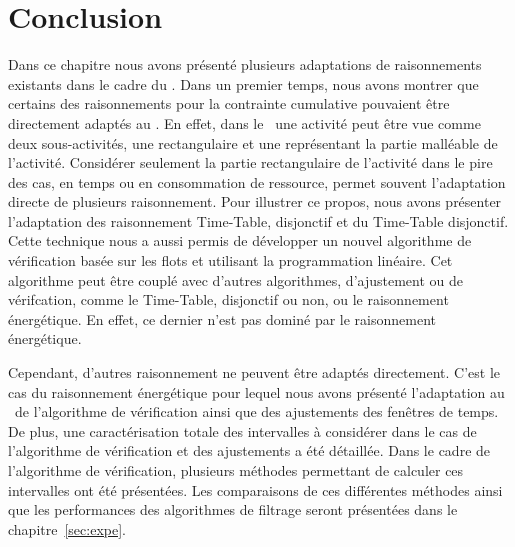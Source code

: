 \section*{Conclusion}

Dans ce chapitre nous avons présenté plusieurs adaptations de
raisonnements existants dans le cadre du \CECSP. Dans un premier
temps, nous avons montrer que certains des raisonnements pour la
contrainte cumulative pouvaient être directement adaptés au \CECSP. En
effet, dans le \CECSP~une activité peut être vue comme deux
sous-activités, une rectangulaire et une représentant la partie
malléable de l'activité. Considérer seulement la partie rectangulaire
de l'activité dans le pire des cas, en temps ou en consommation de
ressource, permet souvent l'adaptation directe de plusieurs
raisonnement. Pour illustrer ce propos, nous avons présenter
l'adaptation des raisonnement Time-Table, disjonctif et du Time-Table
disjonctif. Cette technique nous a aussi permis de développer un
nouvel algorithme de vérification basée sur les flots et utilisant la
programmation linéaire. Cet algorithme peut être couplé avec d'autres
algorithmes, d'ajustement ou de vérifcation, comme le Time-Table,
disjonctif ou non, ou le raisonnement énergétique. En effet, ce
dernier n'est pas dominé par le raisonnement énergétique.

Cependant, d'autres raisonnement ne peuvent être adaptés
directement. C'est le cas du raisonnement énergétique pour lequel nous
avons présenté l'adaptation au \CECSP~de l'algorithme de vérification
ainsi que des ajustements des fenêtres de temps. De plus, une
caractérisation totale des intervalles à considérer dans le cas de
l'algorithme de vérification et des ajustements a été détaillée. Dans
le cadre de l'algorithme de vérification, plusieurs méthodes
permettant de calculer ces intervalles ont été présentées. Les
comparaisons de ces différentes méthodes ainsi que les performances
des algorithmes de filtrage seront présentées dans le
chapitre~\ref{sec:expe}. 